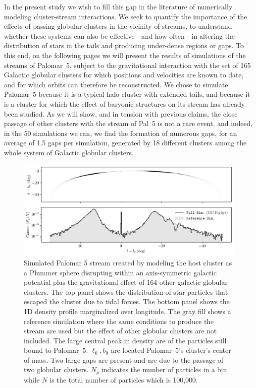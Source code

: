 \documentclass{aa}
\begin{document}
  In the present study we wish to fill this gap in the literature of numerically modeling cluster-stream interactions. We seek to quantify the importance of the effects of passing globular clusters in the vicinity of streams, to understand whether these systems can also be effective - and how often - in altering the distribution of stars in the tails and producing under-dense regions or gaps. To this end, on the following pages we will present the results of simulations of the streams of Palomar~5, subject to the gravitational interaction with the set of 165 Galactic globular clusters for which positions and velocities are known to date, and for which orbits can therefore be reconstructed. We chose to simulate Palomar~5 because it is a typical halo cluster with extended tails, and because it is a cluster for which the effect of baryonic structures on its stream has already been studied. As we will show, and in tension with previous claims, the close passage of other clusters with the stream of Pal~5 is not a rare event, and indeed, in the 50 simulations we ran, we find the formation of numerous gaps, for an average of 1.5 gaps per simulation, generated by 18 different clusters among the whole system of Galactic globular clusters.

  \begin{figure}
    \centering
    \includegraphics[width=\linewidth]{stream_on_sky_Pal5_monte-carlo-009_pouliasis2017pii-GCNBody_pouliasis2017pii.png}
    \caption{Simulated Palomar 5 stream created by modeling the host cluster as a Plummer sphere disrupting within an axis-symmetric galactic potential plus the gravitational effect of 164 other galactic globular clusters. The top panel shows the distribution of star-particles that escaped the cluster due to tidal forces. The bottom panel shows the 1D density profile marginalized over longitude. The gray fill shows a reference simulation where the same conditions to produce the stream are used but the effect of other globular clusters are not included. The large central peak in density are of the particles still bound to Palomar~5. $\ell_0,b_0$ are located Palomar~5's cluster's center of mass. Two large gaps are present and are due to the passage of two globular clusters. $N_p$ indicates the number of particles in a bin while $N$ is the total number of particles which is 100,000.}
    \label{fig:stream_on_sky}
    \end{figure}
\end{document}
